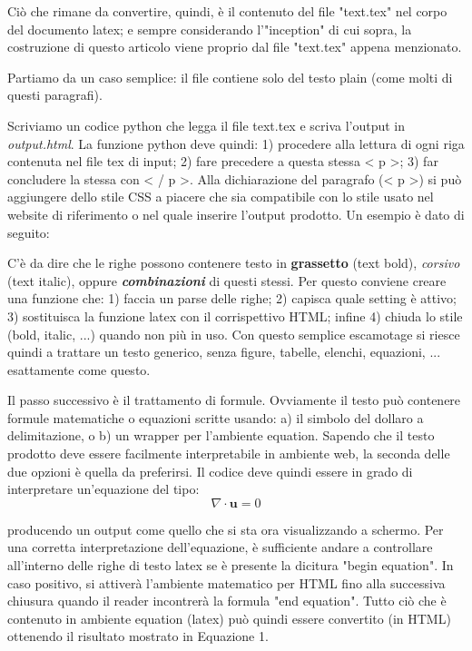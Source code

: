 Ciò che rimane da convertire, quindi, è il contenuto del file "text.tex" nel corpo del documento latex; e sempre considerando l'"inception" di cui sopra, la costruzione di questo articolo viene proprio dal file "text.tex" appena menzionato.

Partiamo da un caso semplice: il file contiene solo del testo plain (come molti di questi paragrafi). 

Scriviamo un codice python che legga il file text.tex e scriva l'output in \textit{output.html}. La funzione python deve quindi: 1) procedere alla lettura di ogni riga contenuta nel file tex di input; 2) fare precedere a questa stessa < p >; 3) far concludere la stessa con < / p >. Alla dichiarazione del paragrafo (< p >) si può aggiungere dello stile CSS a piacere che sia compatibile con lo stile usato nel website di riferimento o nel quale inserire l'output prodotto. Un esempio è dato di seguito:


C'è da dire che le righe possono contenere testo in \textbf{grassetto} (text bold), \textit{corsivo} (text italic), oppure \textbf{\textit{combinazioni}} di questi stessi. Per questo conviene creare una funzione che: 1) faccia un parse delle righe; 2) capisca quale setting è attivo; 3) sostituisca la funzione latex con il corrispettivo HTML; infine 4) chiuda lo stile (bold, italic, ...) quando non più in uso. Con questo semplice escamotage si riesce quindi a trattare un testo generico, senza figure, tabelle, elenchi, equazioni, ... esattamente come questo.

Il passo successivo è il trattamento di formule. Ovviamente il testo può contenere formule matematiche o equazioni scritte usando: a) il simbolo del dollaro a delimitazione, o b) un wrapper per l'ambiente equation. Sapendo che il testo prodotto deve essere facilmente interpretabile in ambiente web, la seconda delle due opzioni è quella da preferirsi. Il codice deve quindi essere in grado di interpretare un'equazione del tipo:
\begin{equation}
\nabla \cdot \mathbf{u} = 0
\end{equation}

producendo un output come quello che si sta ora visualizzando a schermo. Per una corretta interpretazione dell'equazione, è sufficiente andare a controllare all'interno delle righe di testo latex se è presente la dicitura "begin equation". In caso positivo, si attiverà l'ambiente matematico per HTML fino alla successiva chiusura quando il reader incontrerà la formula "end equation". Tutto ciò che è contenuto in ambiente equation (latex) può quindi essere convertito (in HTML) ottenendo il risultato mostrato in Equazione 1. 

